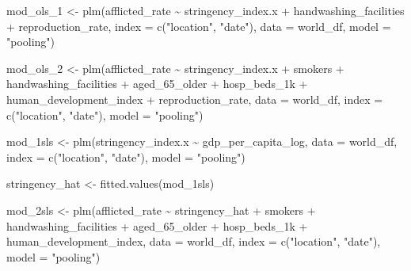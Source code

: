 \documentclass[11pt,preprint, authoryear]{elsarticle}
\numberwithin{equation}{section}
\numberwithin{figure}{section}
\numberwithin{table}{section}
\newenvironment{Shaded}{\begin{snugshade}}{\end{snugshade}}
\newcommand{\AttributeTok}[1]{\textcolor[rgb]{0.77,0.63,0.00}{#1}}
\newcommand{\FunctionTok}[1]{\textcolor[rgb]{0.00,0.00,0.00}{#1}}
\newcommand{\NormalTok}[1]{#1}
\newcommand{\OtherTok}[1]{\textcolor[rgb]{0.56,0.35,0.01}{#1}}
\newcommand{\SpecialCharTok}[1]{\textcolor[rgb]{0.00,0.00,0.00}{#1}}
\newcommand{\StringTok}[1]{\textcolor[rgb]{0.31,0.60,0.02}{#1}}
\begin{document}
\begin{Shaded}
\begin{Highlighting}[]
\NormalTok{mod\_ols\_1 }\OtherTok{\textless{}{-}} \FunctionTok{plm}\NormalTok{(afflicted\_rate }\SpecialCharTok{\textasciitilde{}}\NormalTok{ stringency\_index.x }\SpecialCharTok{+}
\NormalTok{   handwashing\_facilities }\SpecialCharTok{+}\NormalTok{ reproduction\_rate,}
    \AttributeTok{index =} \FunctionTok{c}\NormalTok{(}\StringTok{"location"}\NormalTok{, }\StringTok{"date"}\NormalTok{), }\AttributeTok{data =}\NormalTok{ world\_df, }
   \AttributeTok{model =} \StringTok{"pooling"}\NormalTok{)}

\NormalTok{mod\_ols\_2 }\OtherTok{\textless{}{-}} \FunctionTok{plm}\NormalTok{(afflicted\_rate }\SpecialCharTok{\textasciitilde{}}\NormalTok{ stringency\_index.x }\SpecialCharTok{+}\NormalTok{ smokers}
   \SpecialCharTok{+}\NormalTok{ handwashing\_facilities }\SpecialCharTok{+}\NormalTok{ aged\_65\_older }\SpecialCharTok{+}\NormalTok{ hosp\_beds\_1k}
   \SpecialCharTok{+}\NormalTok{ human\_development\_index }\SpecialCharTok{+}\NormalTok{ reproduction\_rate, }
   \AttributeTok{data =}\NormalTok{ world\_df, }
   \AttributeTok{index =} \FunctionTok{c}\NormalTok{(}\StringTok{"location"}\NormalTok{, }\StringTok{"date"}\NormalTok{), }\AttributeTok{model =} \StringTok{"pooling"}\NormalTok{)}

\NormalTok{mod\_1sls }\OtherTok{\textless{}{-}} \FunctionTok{plm}\NormalTok{(stringency\_index.x }\SpecialCharTok{\textasciitilde{}}\NormalTok{ gdp\_per\_capita\_log,}
                \AttributeTok{data =}\NormalTok{ world\_df, }
                \AttributeTok{index =} \FunctionTok{c}\NormalTok{(}\StringTok{"location"}\NormalTok{, }\StringTok{"date"}\NormalTok{), }\AttributeTok{model =} \StringTok{"pooling"}\NormalTok{)}

\NormalTok{stringency\_hat }\OtherTok{\textless{}{-}} \FunctionTok{fitted.values}\NormalTok{(mod\_1sls)}

\NormalTok{mod\_2sls }\OtherTok{\textless{}{-}} \FunctionTok{plm}\NormalTok{(afflicted\_rate }\SpecialCharTok{\textasciitilde{}}\NormalTok{ stringency\_hat }\SpecialCharTok{+}\NormalTok{ smokers}
   \SpecialCharTok{+}\NormalTok{ handwashing\_facilities }\SpecialCharTok{+}\NormalTok{ aged\_65\_older }\SpecialCharTok{+}\NormalTok{ hosp\_beds\_1k}
   \SpecialCharTok{+}\NormalTok{ human\_development\_index, }
   \AttributeTok{data =}\NormalTok{ world\_df, }
   \AttributeTok{index =} \FunctionTok{c}\NormalTok{(}\StringTok{"location"}\NormalTok{, }\StringTok{"date"}\NormalTok{), }\AttributeTok{model =} \StringTok{"pooling"}\NormalTok{)}


\end{Highlighting}
\end{Shaded}
\end{document}
